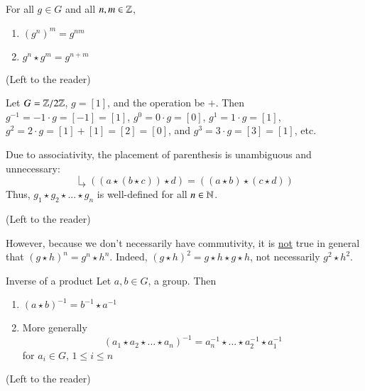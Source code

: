 \documentclass[12pt, a4paper, twoside, openright, titlepage]{book}
\begin{document}
\begin{prop}{}{}
    For all $g \in G$ and all $n,m \in \mathbb Z$, \begin{enumerate}
        \item $(g^n)^m = g^{nm}$
        \item $g^n\star g^m = g^{n+m}$
    \end{enumerate}
    \begin{proof*}{}{}
        (Left to the reader)
    \end{proof*}
\end{prop}

\begin{eg}{}{}
    Let $G = \mathbb Z/2\mathbb Z$, $g = [1]$, and the operation be $+$. Then $g^{-1} = -1\cdot g = [-1] = [1]$, $g^0 = 0\cdot g = [0]$, $g^1 = 1\cdot g = [1]$, $g^2 = 2\cdot g = [1]+[1] = [2] = [0]$, and $g^3 = 3\cdot g = [3] = [1]$, etc.
\end{eg}

\begin{rmk}{}{}
    Due to associativity, the placement of parenthesis is unambiguous and unnecessary:
    $$\drsh ((a\star (b\star c)) \star d) = ((a \star b) \star (c \star d))$$
    Thus, $g_1\star g_2 \star ... \star g_n$ is well-defined for all $n \in \mathbb N$. 
    \begin{proof*}{}{}
        (Left to the reader)
    \end{proof*}
\end{rmk}

\begin{note*}{}{}
    However, because we don't necessarily have commutivity, it is \underline{not} true in general that $(g\star h)^n = g^n \star h^n$. Indeed, $(g\star h )^2 = g\star h \star g \star h$, not necessarily $g^2\star h^2$.
\end{note*}

\begin{rmk}{Inverse of a product}{}
    Let $a,b \in G$, a group. Then \begin{enumerate}
        \item $(a \star b)^{-1} = b^{-1}\star a^{-1}$
        \item More generally \begin{equation}
            (a_1\star a_2 \star ... \star a_n)^{-1} = a_n^{-1}\star ... \star a_2^{-1} \star a_1^{-1}
        \end{equation}
        for $a_i \in G$, $1 \leq i \leq n$
    \end{enumerate}
    \begin{proof*}{}{}
        (Left to the reader)
    \end{proof*}
\end{rmk}
\end{document}
